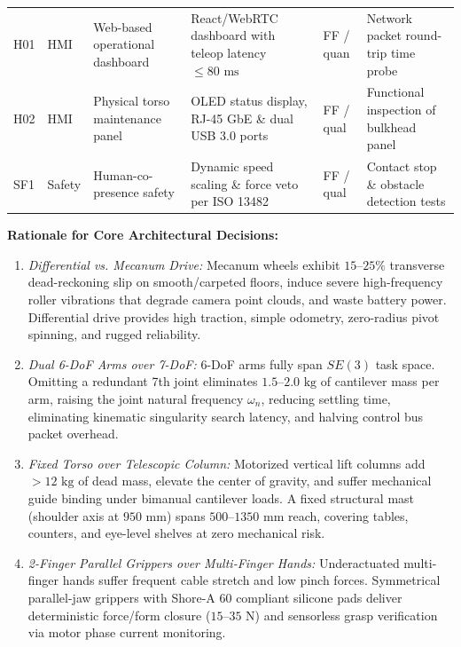 \documentclass[10pt,a4paper]{article}
\begin{document}
\begin{table}[ht]
\begin{tabularx}{\textwidth}{@{}llXllY@{}}
H01 & HMI & Web-based operational dashboard & React/WebRTC dashboard with teleop latency $\le 80\text{ ms}$ & FF / quan & Network packet round-trip time probe \\
H02 & HMI & Physical torso maintenance panel & OLED status display, RJ-45 GbE \& dual USB 3.0 ports & FF / qual & Functional inspection of bulkhead panel \\
SF1 & Safety & Human-co-presence safety & Dynamic speed scaling \& force veto per ISO 13482 & FF / qual & Contact stop \& obstacle detection tests \\
\bottomrule
\end{tabularx}
\vspace{-0.5em}
\end{table}

\textbf{Rationale for Core Architectural Decisions:}
\begin{enumerate}[leftmargin=1.2em,noitemsep,topsep=1pt]
  \item \emph{Differential vs. Mecanum Drive:} Mecanum wheels exhibit $15\text{--}25\%$ transverse dead-reckoning slip on smooth/carpeted floors, induce severe high-frequency roller vibrations that degrade camera point clouds, and waste battery power. Differential drive provides high traction, simple odometry, zero-radius pivot spinning, and rugged reliability.
  \item \emph{Dual 6-DoF Arms over 7-DoF:} 6-DoF arms fully span $SE(3)$ task space. Omitting a redundant 7th joint eliminates $1.5\text{--}2.0\text{ kg}$ of cantilever mass per arm, raising the joint natural frequency $\omega_n$, reducing settling time, eliminating kinematic singularity search latency, and halving control bus packet overhead.
  \item \emph{Fixed Torso over Telescopic Column:} Motorized vertical lift columns add $>12\text{ kg}$ of dead mass, elevate the center of gravity, and suffer mechanical guide binding under bimanual cantilever loads. A fixed structural mast (shoulder axis at $950\text{ mm}$) spans $500\text{--}1350\text{ mm}$ reach, covering tables, counters, and eye-level shelves at zero mechanical risk.
  \item \emph{2-Finger Parallel Grippers over Multi-Finger Hands:} Underactuated multi-finger hands suffer frequent cable stretch and low pinch forces. Symmetrical parallel-jaw grippers with Shore-A 60 compliant silicone pads deliver deterministic force/form closure ($15\text{--}35\text{ N}$) and sensorless grasp verification via motor phase current monitoring.
\end{enumerate}
\end{document}

